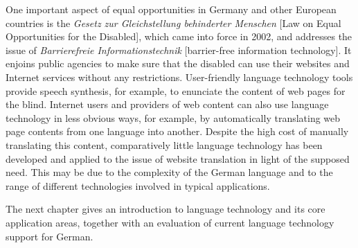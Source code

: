 \begin{multicols}{2}
One important aspect of equal opportunities in Germany and other European countries is the \textit{Gesetz zur Gleichstellung behinderter Menschen} [Law on Equal Opportunities for the Disabled], which came into force in 2002, and addresses the issue of \textit{Barrierefreie Informationstechnik} [barrier-free information technology]. It enjoins public agencies to make sure that the disabled can use their websites and Internet services without any restrictions. User-friendly language technology tools provide speech synthesis, for example, to enunciate the content of web pages for the blind. Internet users and providers of web content can also use language technology in less obvious ways, for example, by automatically translating web page contents from one language into another. Despite the high cost of manually translating this content, comparatively little language technology has been developed and applied to the issue of website translation in light of the supposed need. This may be due to the complexity of the German language and to the range of different technologies involved in typical applications.

The next chapter gives an introduction to language technology and its core application areas, together with an evaluation of current language technology support for German.
\end{multicols}

\clearpage


